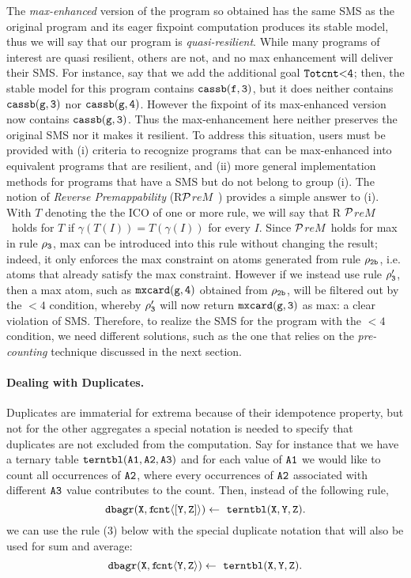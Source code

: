 \documentclass[11pt]{article}
\def\inv{\vspace{-0.2cm}}
\def\sinv{\vspace{-0.1cm}}
\def\inv{\vspace{-0.2cm}}
\def\sinv{\vspace{-0.1cm}}
\def\prem{$\cal P$$\!reM$~}
\begin{document}
The {\it max-enhanced} version of the program so obtained  has the same SMS as the original program
and its   eager fixpoint computation produces its stable model, thus we will say that our program is {\it quasi-resilient}.
While many programs of interest are quasi resilient, others are not, and no max enhancement will deliver their SMS.
For instance, say that we add the additional 
goal  $\tt Totcnt {<}4$;  then,  the stable model for this program contains   $\tt cassb(f, 3)$,  
but it does neither contains $\tt cassb(g, 3)$ nor $\tt cassb(g, 4)$. However the
fixpoint of its max-enhanced version now contains $\tt cassb(g, 3)$. Thus  the max-enhancement here
neither preserves the original SMS  nor it  makes it resilient.  To address this situation,  users
must be provided with (i)  criteria to recognize programs that can  be max-enhanced into equivalent 
programs that are resilient, and (ii)  more general implementation methods for programs that have a SMS
but do not belong to group (i). The notion of {\em Reverse Premappability} (R\prem)  provides a simple answer
to (i).  With  $T$  denoting the  the ICO of one or more rule,  we will say that R \prem  holds for $T$ if
$\gamma(T(I)) = T(\gamma(I))$ for every $I$.  Since  \prem holds for  max in rule $\tt \rho_3$,
max can be introduced into this rule  without changing the result; indeed, 
 it  only enforces the max constraint on atoms generated from rule $\tt \rho_{2b}$, i.e. atoms that already
satisfy the max constraint. However if we instead use rule  $\tt \rho'_3$, then   a max atom,   such as  $\tt mxcard(g, 4)$
obtained from    $\tt \rho_{2b}$, will be filtered out by the $<4$ condition,
 whereby  $\tt \rho'_3$ will now return $\tt mxcard(g, 3)$ as max: a clear violation of SMS.
Therefore, to realize  the SMS for the program with the ${<}4$ condition, we need
different solutions, such as the one that relies on the   {\it pre-counting}  technique discussed in the next section.
 
 \paragraph{\bf  Dealing with Duplicates.}
 Duplicates are immaterial for extrema because of their
idempotence property, but not for the other aggregates a special notation 
is needed to specify that duplicates are not excluded from the computation.
Say for instance that we have
a  ternary table $\tt terntbl(A1, A2, A3)$ and for each value of $\tt A1$ we would like  to count all occurrences 
of $\tt A2$, where every occurrences of  $\tt A2$ associated with different 
$\tt A3$ value contributes to the count. Then, instead of the following rule,
\inv\begin{equation}
\tt  dbagr(X, f\!cnt\langle [Y, Z] \rangle)  \leftarrow ~ terntbl(X, Y, Z). \sinv
\end {equation}
we can use the rule (3) below with the special duplicate notation that will also be used for sum and average:
\inv\begin{equation}
\tt dbagr(X, f\!cnt\langle Y, Z \rangle)  \leftarrow ~ terntbl(X, Y, Z).
\end {equation}
\end{document}
